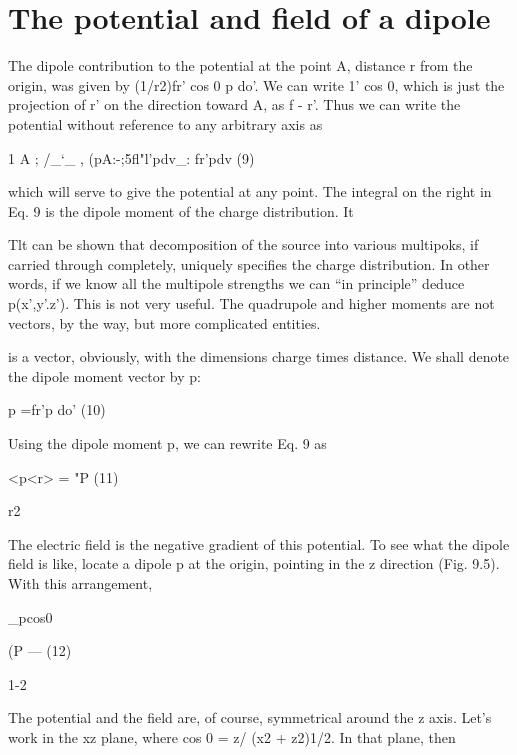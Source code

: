 {\section{The potential and field of a dipole}

The dipole contribution to the potential at the point A, distance
r from the origin, was given by (1/r2)fr' cos 0 p do'. We can write
1' cos 0, which is just the projection of r' on the direction toward A,
as f - r'. Thus we can write the potential without reference to any
arbitrary axis as

\begin{equation}
\end{equation}
1 A ; /_‘_ ,
(pA:-;5fl"l'pdv_: fr'pdv (9)

which will serve to give the potential at any point. The integral on
the right in Eq. 9 is the dipole moment of the charge distribution. It

Tlt can be shown that decomposition of the source into various multipoks, if carried
through completely, uniquely specifies the charge distribution. In other words, if we
know all the multipole strengths we can ``in principle'' deduce p(x',y'.z'). This is not
very useful. The quadrupole and higher moments are not vectors, by the way, but
more complicated entities.

is a vector, obviously, with the dimensions charge times distance. We
shall denote the dipole moment vector by p:

\begin{equation}
\end{equation}
p =fr'p do' (10)

Using the dipole moment p, we can rewrite Eq. 9 as

\begin{equation}
\end{equation}
<p<r> = "P (11)

r2

The electric field is the negative gradient of this potential. To see
what the dipole field is like, locate a dipole p at the origin, pointing
in the z direction (Fig. 9.5). With this arrangement,

\begin{equation}
\end{equation}
_pcos0

(P  ---  (12)

1-2

The potential and the field are, of course, symmetrical around the
z axis. Let's work in the xz plane, where cos 0 = z/ (x2 + z2)1/2. In
that plane, then

}
